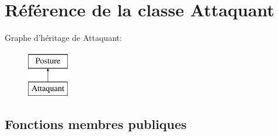 \hypertarget{classAttaquant}{\section{Référence de la classe Attaquant}
\label{classAttaquant}
}
Graphe d'héritage de Attaquant\-:\begin{figure}[H]
\begin{center}
\leavevmode
\includegraphics[height=2.000000cm]{classAttaquant}
\end{center}
\end{figure}
\subsection*{Fonctions membres publiques}
